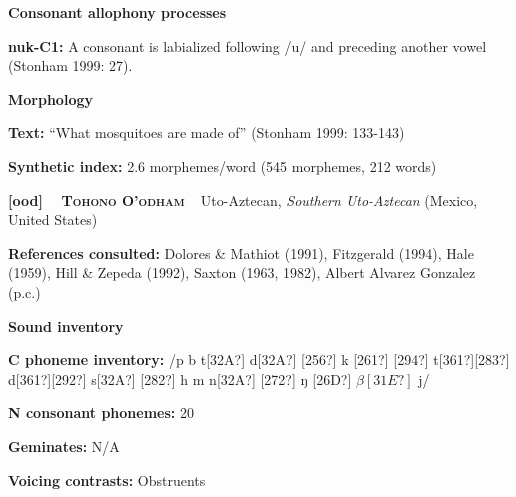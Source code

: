 \begin{styleBody}
\textbf{Consonant allophony processes}
\end{styleBody}

\begin{styleBody}
\textbf{nuk-C1: }A consonant is labialized following /u/ and preceding another vowel (Stonham 1999: 27).
\end{styleBody}

\begin{styleBody}
\textbf{Morphology}
\end{styleBody}

\begin{styleBody}
\textbf{Text:} “What mosquitoes are made of” (Stonham 1999: 133-143)
\end{styleBody}

\begin{styleBody}
\textbf{Synthetic index: }2.6 morphemes/word (545 morphemes, 212 words)
\end{styleBody}

\clearpage\begin{styleBody}
\textbf{[ood] }\ \ \textbf{\textsc{Tohono O’odham}}\textbf{\ \ }Uto-Aztecan, \textit{Southern Uto-Aztecan} (Mexico, United States)
\end{styleBody}

\begin{styleBody}
\textbf{References consulted: }Dolores \& Mathiot (1991), Fitzgerald (1994), Hale (1959), Hill \& Zepeda (1992), Saxton (1963, 1982), Albert Alvarez Gonzalez (p.c.)
\end{styleBody}

\begin{styleBody}
\textbf{Sound inventory}
\end{styleBody}

\begin{styleBody}
\textbf{C phoneme inventory:} /p b t[32A?] d[32A?] [256?] k [261?] [294?] t[361?][283?] d[361?][292?] s[32A?] [282?] h m n[32A?] [272?] ŋ [26D?] $\beta [31E?]$ j/
\end{styleBody}

\begin{styleBody}
\textbf{N consonant phonemes:} 20
\end{styleBody}

\begin{styleBody}
\textbf{Geminates:} N/A
\end{styleBody}

\begin{styleBody}
\textbf{Voicing contrasts:} Obstruents
\end{styleBody}

